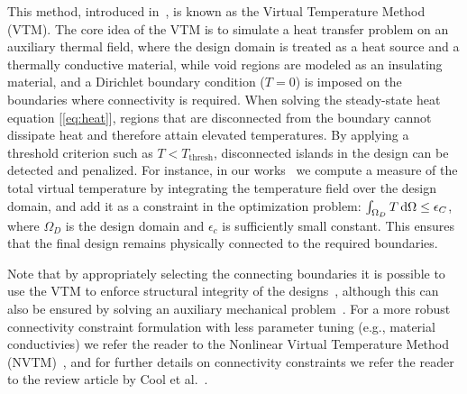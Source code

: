This method, introduced in~\cite{li_structural_2016}, is known as the Virtual Temperature
Method (VTM). The core idea of the VTM is to simulate a heat transfer problem on an auxiliary thermal field, where the design 
domain is treated as a heat source and a thermally conductive material, while void regions are modeled as an
insulating material, and a Dirichlet boundary condition ($T = 0$) is imposed on the boundaries where connectivity is required. When 
solving the steady-state heat equation [\eqref{eq:heat}], regions that are disconnected from the boundary 
cannot dissipate heat and therefore attain elevated temperatures. By applying a threshold criterion such as $T < T_\text{thresh}$, disconnected islands in the design can be 
detected and penalized. For instance, in our works~\cite{ownpub1,ownpub2} we compute a measure of the total virtual temperature
by integrating the temperature field over the design domain, and add it as a constraint in the optimization problem:
$\int_{\Omega_D} T \mathop{}\!\text{d} \Omega \leq \epsilon_C$, where $\Omega_D$ is the design domain and $\epsilon_c$ is sufficiently small constant. This ensures that the final design remains physically connected to the required 
boundaries. 


Note that by appropriately selecting the connecting boundaries it is possible to use the VTM to enforce
structural integrity of the designs~\cite{structural_heat}, although this can also be ensured by solving an auxiliary
mechanical problem~\cite{structural_integrity}. For a more robust connectivity constraint formulation with less parameter tuning (e.g., material conductivies) we refer the reader to the Nonlinear 
Virtual Temperature Method (NVTM)~\cite{nvtm}, and for further details on connectivity constraints we refer the reader to the review 
article by Cool et al.~\cite{vanessa}.
